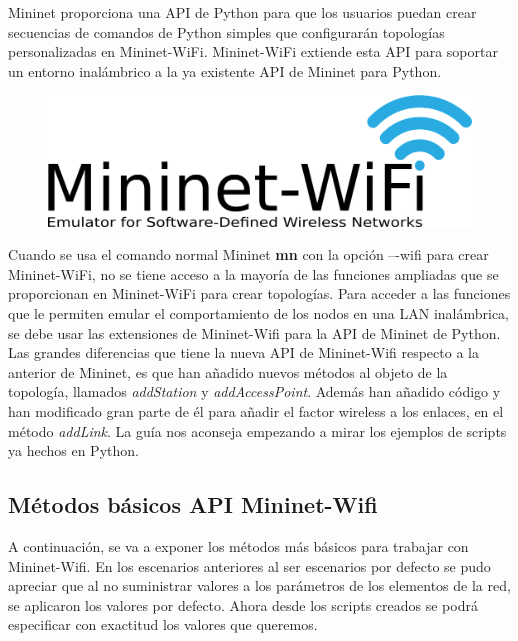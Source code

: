 Mininet proporciona una API de Python para que los usuarios puedan crear secuencias de comandos de Python simples que configurarán 
topologías personalizadas en Mininet-WiFi. Mininet-WiFi extiende esta API para soportar un entorno inalámbrico a la ya existente API de Mininet para Python.\newline
\newline
\begin{figure}[!htb]
  \centering
    \includegraphics[width=0.8\linewidth]{./img/test/mininet-wifi-logo.png}
\end{figure}

Cuando se usa el comando normal Mininet \textbf{mn} con la opción –-wifi para crear Mininet-WiFi, no se tiene acceso a la mayoría de las funciones ampliadas que se proporcionan en Mininet-WiFi para crear topologías. Para acceder a las funciones que le permiten emular el comportamiento de los nodos en una LAN inalámbrica, se debe
usar las extensiones de Mininet-Wifi para la API de Mininet de Python.\newline
\newline
Las grandes diferencias que tiene la nueva API de Mininet-Wifi respecto a la anterior de Mininet, es que han añadido nuevos métodos al objeto de la topología, llamados \textit{addStation} y \textit{addAccessPoint}. Además han añadido código y han modificado gran parte de él para añadir el factor wireless a los enlaces, en el método \textit{addLink}. La guía nos aconseja empezando a mirar los ejemplos de scripts ya hechos en Python.\newline

\subsection{Métodos básicos API Mininet-Wifi}
\newline
A continuación, se va a exponer los métodos más básicos para trabajar con Mininet-Wifi. En los escenarios anteriores al ser escenarios por defecto se pudo apreciar que al no suministrar valores a los parámetros de los elementos de la red, se aplicaron los valores por defecto. Ahora desde los scripts creados se podrá especificar con exactitud los valores que queremos. 

